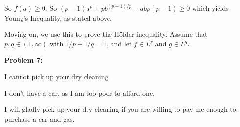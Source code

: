 \documentclass[a4paper,12pt]{article}
\newcommand{\shunt}{\vspace{20mm}}
\begin{document}
So $f(a) \geq 0$. So $(p-1)a^p+pb^{(p-1)/p} -abp(p-1) \geq 0$ which yields Young's Inequality, as stated above.

Moving on, we use this to prove the H{\"o}lder inequality. Assume that $p,q \in (1, \infty)$ with $1/p + 1/q = 1$, and let $f \in L^p$ and $g \in L^q$. 




\shunt

{\bf Problem 7:}

I cannot pick up your dry cleaning.

I don't have a car, as I am too poor to afford one.

I will gladly pick up your dry cleaning if you are willing to pay me enough to purchase a car and gas.

\shunt
\end{document}
